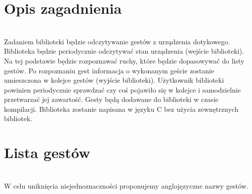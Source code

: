 \documentclass[a4paper,12pt]{article}
\begin{document}
\section{Opis zagadnienia} \ \\[0.1cm]
\indent Zadaniem biblioteki będzie odczytywanie gestów z urządzenia dotykowego. Biblioteka będzie periodycznie odczytywać stan urządzenia (wejście biblioteki). Na tej podstawie będzie rozpoznawać ruchy, które będzie dopasowywać do listy gestów. Po rozpoznaniu gest informacja o wykonanym geście zostanie umieszczona w kolejce gestów (wyjście biblioteki). Użytkownik biblioteki powinien periodycznie sprawdzać czy coś pojawiło się w kolejce i samodzielnie przetwarzać jej zawartość. Gesty będą dodawane do biblioteki w czasie kompilacji. Biblioteka zostanie napisana w języku C bez użycia zewnętrznych bibliotek.



\section{Lista gestów} \ \\[0.1cm]
\indent W celu uniknięcia niejednoznaczności proponujemy anglojęzyczne nazwy gestów.\\
\end{document}
